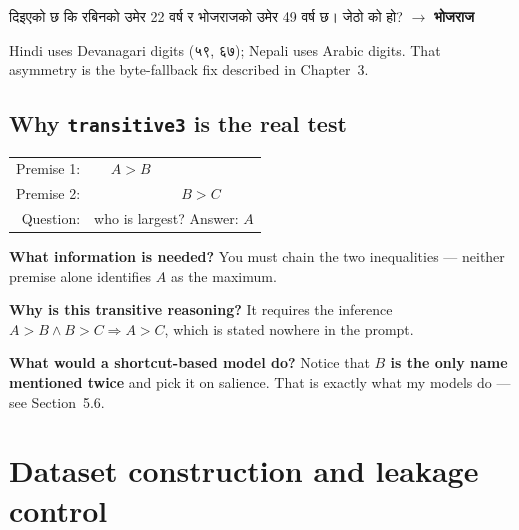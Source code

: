 \documentclass[11pt]{report}
\newcommand{\dn}[1]{{\devanagarifont #1}}
\begin{document}
\begin{vexample}
\dn{दिइएको छ कि रबिनको उमेर 22 वर्ष र भोजराजको उमेर 49 वर्ष छ। जेठो को हो?}
$\rightarrow$ \textbf{\dn{भोजराज}}

\smallskip
Hindi uses Devanagari digits (\dn{५९}, \dn{६७}); Nepali uses Arabic digits.
That asymmetry is the byte-fallback fix described in Chapter~3.
\end{vexample}

\subsection{Why \texttt{transitive3} is the real test}

\begin{center}
\begin{tabular}{rcl}
Premise 1: & $A > B$ & \\
Premise 2: & & $B > C$ \\
\midrule
Question: & \multicolumn{2}{l}{who is largest? \qquad Answer: $A$} \\
\end{tabular}
\end{center}

\begin{deeper}
\textbf{What information is needed?} You must chain the two inequalities ---
neither premise alone identifies $A$ as the maximum.

\smallskip
\textbf{Why is this transitive reasoning?} It requires the inference
$A > B \wedge B > C \Longrightarrow A > C$, which is stated nowhere in the
prompt.

\smallskip
\textbf{What would a shortcut-based model do?} Notice that \textbf{$B$ is the
only name mentioned twice} and pick it on salience. That is exactly what my
models do --- see Section~5.6.
\end{deeper}

\section{Dataset construction and leakage control}
\end{document}
